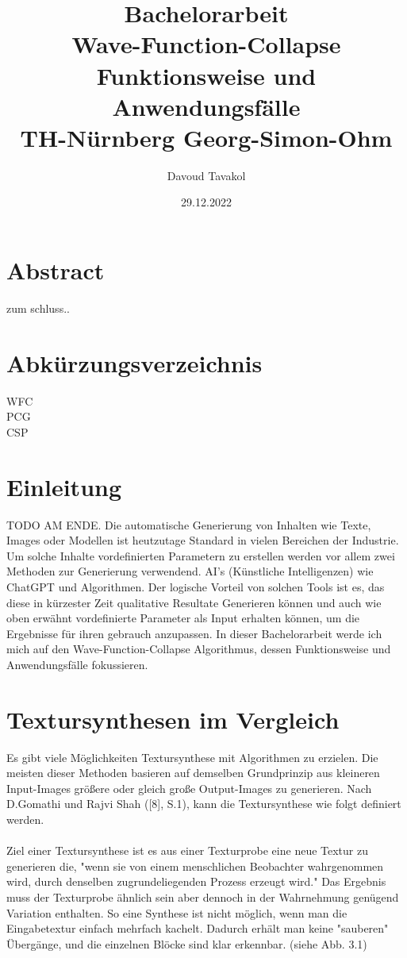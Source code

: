 \documentclass[12pt]{report}
\title{
{Bachelorarbeit}\\
{\vspace{10mm}}
{\small Wave-Function-Collapse}\\
{\small Funktionsweise und Anwendungsfälle}\\
{\small TH-Nürnberg Georg-Simon-Ohm}\\
}
\author{Davoud Tavakol}
\date{29.12.2022}
\begin{document}
\maketitle

{\let\clearpage\relax\chapter*{Abstract}}

zum schluss..

\tableofcontents

{\let\clearpage\relax\chapter{Abkürzungsverzeichnis}}

WFC\\
PCG\\
CSP\\

\chapter{Einleitung}

TODO AM ENDE.
Die automatische Generierung von Inhalten wie Texte, Images oder Modellen ist heutzutage Standard in vielen Bereichen der Industrie.
Um solche Inhalte vordefinierten Parametern zu erstellen werden vor allem zwei Methoden zur Generierung verwendend.
AI's {(Künstliche Intelligenzen)} wie ChatGPT und Algorithmen.
Der logische Vorteil von solchen Tools ist es, das diese in kürzester Zeit qualitative Resultate Generieren können und auch wie oben erwähnt vordefinierte Parameter als Input erhalten können,
um die Ergebnisse für ihren gebrauch anzupassen.
In dieser Bachelorarbeit werde ich mich auf den Wave-Function-Collapse Algorithmus, dessen Funktionsweise und Anwendungsfälle fokussieren.

\chapter{Textursynthesen im Vergleich}

Es gibt viele Möglichkeiten Textursynthese mit Algorithmen zu erzielen.
Die meisten dieser Methoden basieren auf demselben Grundprinzip aus kleineren Input-Images größere oder gleich große Output-Images zu generieren.
Nach D.Gomathi und Rajvi Shah {([8], S.1)}, kann die Textursynthese wie folgt definiert werden.\\\\
Ziel einer Textursynthese ist es aus einer Texturprobe eine neue Textur zu generieren die, "wenn sie von einem menschlichen Beobachter wahrgenommen wird,
durch denselben zugrundeliegenden Prozess erzeugt wird."
Das Ergebnis muss der Texturprobe ähnlich sein aber dennoch in der Wahrnehmung genügend Variation enthalten.
So eine Synthese ist nicht möglich, wenn man die Eingabetextur einfach mehrfach kachelt.
Dadurch erhält man keine "sauberen" Übergänge, und die einzelnen Blöcke sind klar erkennbar. {(siehe Abb. 3.1)}
\end{document}
